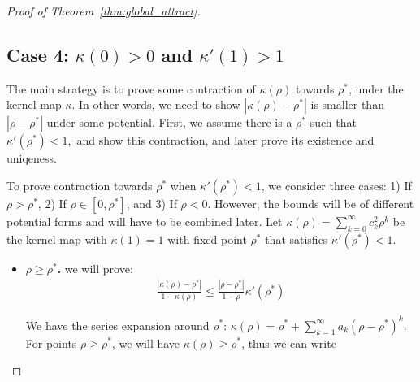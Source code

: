 \documentclass[twoside]{article}
\theoremstyle{definition}
\begin{document}
\begin{proof}[Proof of Theorem~\ref{thm:global_attract}]
\subsection*{Case 4: $\kappa(0)>0$ and $\kappa'(1)>1$}
The main strategy is to prove some contraction of $\kappa(\rho)$ towards $\rho^*$, under the kernel map $\kappa$. In other words, we need to show $|\kappa(\rho)-\rho^*|$ is smaller than $|\rho-\rho^*|$ under some potential. First, we assume there is a $\rho^*$ such that $\kappa'(\rho^*)<1,$ and show this contraction, and later prove its existence and uniqeness. 

To prove contraction towards $\rho^*$ when $\kappa'(\rho^*)<1$, we consider three cases: 1) If $\rho > \rho^*$, 2) If $\rho \in [0,\rho^*]$, and 3) If $\rho < 0$. However, the bounds will be of different potential forms and will have to be combined later.  Let $\kappa(\rho) = \sum_{k=0}^\infty c_k^2 \rho^k$ be the kernel map with $\kappa(1)= 1$ with fixed point $\rho^*$ that satisfies $\kappa'(\rho^*)<1.$

\begin{itemize}
\item \textbf{$\rho\ge \rho^*$.} we will prove:
\begin{align*}
\frac{|\kappa(\rho)-\rho^*|}{1-\kappa(\rho)} \le \frac{|\rho-\rho^*|}{1-\rho} \kappa'(\rho^*)
\end{align*}

We have the series expansion around $\rho^*$: $\kappa(\rho) = \rho^* + \sum_{k=1}^\infty a_k (\rho-\rho^*)^k$. For points $\rho\ge \rho^*$, we will have $\kappa(\rho)\ge \rho^*$, thus we can write


\end{itemize}
\end{proof}
\end{document}
